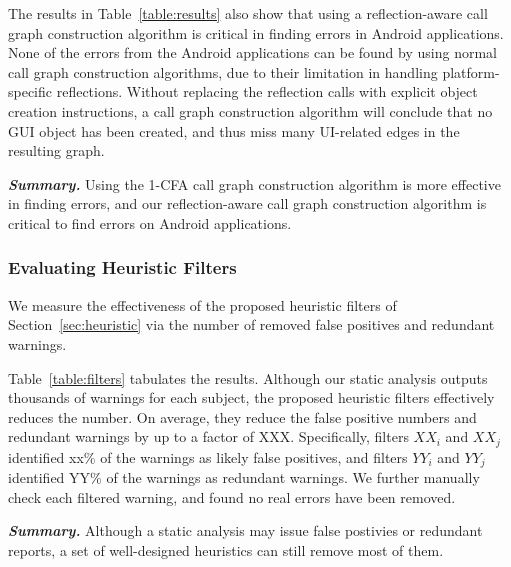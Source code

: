 The results in Table~\ref{table:results} also show that using a reflection-aware
call graph construction algorithm is critical in finding errors in Android
applications. None of the errors from the Android applications
can be found by using normal call graph construction algorithms, due to
their limitation in handling platform-specific reflections. Without
replacing the reflection calls with explicit object creation instructions,
a call graph construction algorithm will
conclude that no GUI object has been created, and thus miss many UI-related
edges in the resulting graph.

\vspace{1mm}

\noindent \textbf{\textit{Summary.}} Using the 1-CFA call graph construction
algorithm is more effective in finding errors, and our reflection-aware call
graph construction algorithm is critical to find errors on
Android applications.

\subsubsection{Evaluating Heuristic Filters}
\label{sec:filters}

We measure the effectiveness of the proposed heuristic filters of
Section~\ref{sec:heuristic} via the number of removed false positives and
redundant warnings.

Table~\ref{table:filters} tabulates the results. Although
our static analysis outputs thousands of warnings for each
subject, the proposed heuristic filters effectively reduces
the number. On average, they
 reduce the false positive numbers and redundant warnings by up to a factor of
XXX. Specifically, filters $XX_i$ and $XX_j$  identified xx\% of
the warnings as likely false positives, and filters $YY_i$
and $YY_j$ identified YY\% of the warnings as redundant warnings.
We further manually check each filtered warning, and found no
real errors have been removed.

\vspace{1mm}

\noindent \textbf{\textit{Summary.}} Although a static analysis may
issue false postivies or redundant reports, a set of well-designed
heuristics can still remove most of them.

